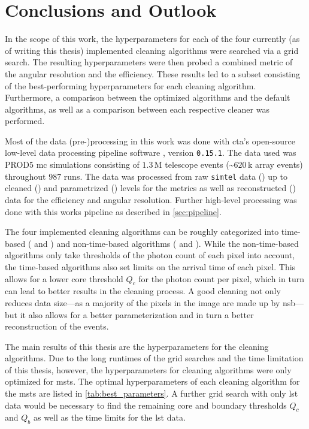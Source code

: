 \chapter{Conclusions and Outlook}
\label{ch:conclusions}

In the scope of this work, the hyperparameters for each of the four currently (as of writing this thesis)
implemented cleaning algorithms were searched via a grid search. The resulting hyperparameters were then
probed \wrt a combined metric of the angular resolution and the efficiency. These results led to a subset
consisting of the best-performing hyperparameters for each cleaning algorithm. Furthermore, a comparison between the
optimized algorithms and the default algorithms, as well as a comparison between each respective
cleaner was performed.

Most of the data (pre-)processing in this work was done with \gls{cta}'s open-source low-level data processing pipeline
software \ctapipe{}, version \texttt{0.15.1}. The data used was PROD5 \gls{mc} simulations consisting of
\(\num{1.3}\)\,M telescope events (\sim\(\num{620}\)\,k array events) throughout \(987\) runs. The data
was processed from raw \texttt{simtel} data (\rzero) up to cleaned (\dloa) and parametrized (\dlob) levels
for the metrics as well as reconstructed (\dlt) data for the efficiency and angular resolution.
Further high-level processing was done with this works pipeline as described in \autoref{sec:pipeline}.

The four implemented cleaning algorithms can be roughly categorized into time-based (\fact{} and \tcc) and non-time-based
algorithms (\tailcuts{} and \mars{}). While the non-time-based algorithms only take thresholds of the photon count of each pixel
into account, the time-based algorithms also set limits on the arrival time of each pixel. This allows
for a lower core threshold \(Q_c\) for the photon count per pixel, which in turn can lead to better
results in the cleaning process. A good cleaning not only reduces data size---as a majority of the
pixels in the image are made up by \gls{nsb}---but it also allows for a better parameterization and in turn
a better reconstruction of the events.

The main results of this thesis are the hyperparameters for the cleaning algorithms.
Due to the long runtimes of the grid searches and the time limitation of this thesis, however, the hyperparameters
for cleaning algorithms were only optimized for \glspl{mst}. The optimal hyperparameters of each cleaning algorithm for
the \glspl{mst} are listed in \autoref{tab:best_parameters}. A further grid search with only \gls{lst}
data would be necessary to find the remaining core and boundary thresholds \(Q_c\) and \(Q_b\) as well
as the time limits for the \gls{lst} data.

